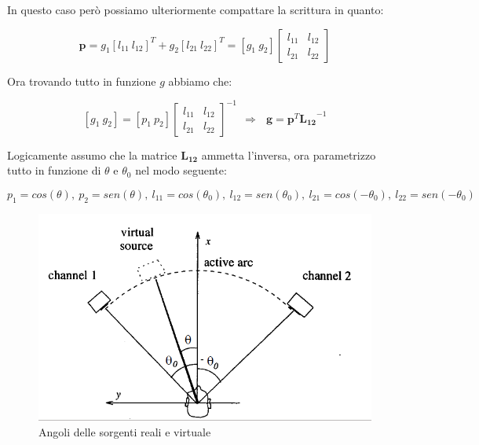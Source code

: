 \documentclass[12pt,a4paper]{report}
\begin{document}
In questo caso però possiamo ulteriormente compattare la scrittura in quanto:

\begin{equation}
\boldsymbol{p}=g_1 {\left[ l_{11} \ l_{12} \right]}^T + g_2 {\left[ l_{21} \ l_{22} \right]}^T= \left[ g_1 \ g_2 \right] \left[\begin{matrix}
l_{11} & l_{12}\\ l_{21} & l_{22}
\end{matrix} \right]
\label{eq:cccc}
\end{equation}

Ora trovando tutto in funzione $g$ abbiamo che:

\begin{equation}
\left[g_1 \ g_2\right] = \left[ p_1 \ p_2 \right]  {\left[\begin{matrix} 
l_{11} & l_{12}\\ l_{21} & l_{22}
\end{matrix} \right]}^{-1} \ \ \Rightarrow \ \ \ \boldsymbol{g}=\boldsymbol{p}^T {\boldsymbol{L_{12}}}^{-1}
\label{eq:dddd}
\end{equation}

Logicamente assumo che la matrice $\boldsymbol{L_{12}}$ ammetta l'inversa, ora parametrizzo tutto in funzione di $\theta$ e $\theta_0$ nel modo seguente: 

\[ p_1=cos(\theta),\ p_2=sen(\theta),\ l_{11}=cos(\theta_0),\ l_{12}=sen(\theta_0),\ l_{21}=cos(-\theta_0),\ l_{22}=sen(-\theta_0) \]

\begin{figure}[htbp]
	\centering
	\includegraphics[scale=0.45]{figures/angoli.png}
	\caption {Angoli delle sorgenti reali e virtuale} 
	\label{fig:angoli}
	\end{figure}
\end{document}
